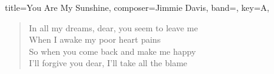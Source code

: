 \documentclass{article}
\begin{document}
\begin{song}{
    title={You Are My Sunshine},
    composer={Jimmie Davis},
    band={\band},
    key={A},
}
\begin{chorus}[after-label=]\end{chorus}

\begin{verse}
In all my dreams, dear, you seem to leave me \\
When I awake my poor heart pains \\
So when you come back and make me happy \\
I'll forgive you dear, I'll take all the blame
\end{verse}

\begin{chorus}[after-label=]\end{chorus}

\end{song}
\end{document}
